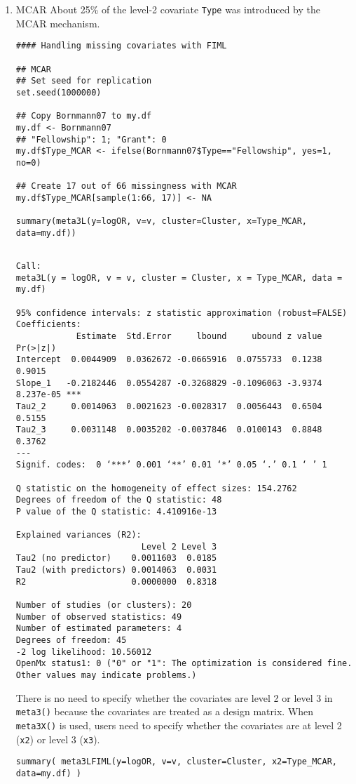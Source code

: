 \documentclass[11pt]{article}
\begin{document}
\begin{enumerate}
\item MCAR
\label{sec:org86f3a8c}
About 25\% of the level-2 covariate \texttt{Type} was introduced by the MCAR mechanism. 
\begin{verbatim}
#### Handling missing covariates with FIML

## MCAR
## Set seed for replication
set.seed(1000000)

## Copy Bornmann07 to my.df
my.df <- Bornmann07
## "Fellowship": 1; "Grant": 0
my.df$Type_MCAR <- ifelse(Bornmann07$Type=="Fellowship", yes=1, no=0)

## Create 17 out of 66 missingness with MCAR
my.df$Type_MCAR[sample(1:66, 17)] <- NA

summary(meta3L(y=logOR, v=v, cluster=Cluster, x=Type_MCAR, data=my.df))
\end{verbatim}

\begin{verbatim}

Call:
meta3L(y = logOR, v = v, cluster = Cluster, x = Type_MCAR, data = my.df)

95% confidence intervals: z statistic approximation (robust=FALSE)
Coefficients:
            Estimate  Std.Error     lbound     ubound z value  Pr(>|z|)    
Intercept  0.0044909  0.0362672 -0.0665916  0.0755733  0.1238    0.9015    
Slope_1   -0.2182446  0.0554287 -0.3268829 -0.1096063 -3.9374 8.237e-05 ***
Tau2_2     0.0014063  0.0021623 -0.0028317  0.0056443  0.6504    0.5155    
Tau2_3     0.0031148  0.0035202 -0.0037846  0.0100143  0.8848    0.3762    
---
Signif. codes:  0 ‘***’ 0.001 ‘**’ 0.01 ‘*’ 0.05 ‘.’ 0.1 ‘ ’ 1

Q statistic on the homogeneity of effect sizes: 154.2762
Degrees of freedom of the Q statistic: 48
P value of the Q statistic: 4.410916e-13

Explained variances (R2):
                         Level 2 Level 3
Tau2 (no predictor)    0.0011603  0.0185
Tau2 (with predictors) 0.0014063  0.0031
R2                     0.0000000  0.8318

Number of studies (or clusters): 20
Number of observed statistics: 49
Number of estimated parameters: 4
Degrees of freedom: 45
-2 log likelihood: 10.56012 
OpenMx status1: 0 ("0" or "1": The optimization is considered fine.
Other values may indicate problems.)
\end{verbatim}

There is no need to specify whether the covariates are level 2 or level 3 in \texttt{meta3()} because the covariates are treated as a design matrix. When \texttt{meta3X()} is used, users need to specify whether the covariates are at level 2 (\texttt{x2}) or level 3 (\texttt{x3}).
\begin{verbatim}
summary( meta3LFIML(y=logOR, v=v, cluster=Cluster, x2=Type_MCAR, data=my.df) )
\end{verbatim}


\end{enumerate}
\end{document}
